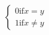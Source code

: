 \documentclass[preview]{standalone}
\begin{document}
\begin{align*}
\begin{cases} 0 \text{if} x=y \\1 \text{if} x \neq y\end{cases}
\end{align*}
\end{document}
